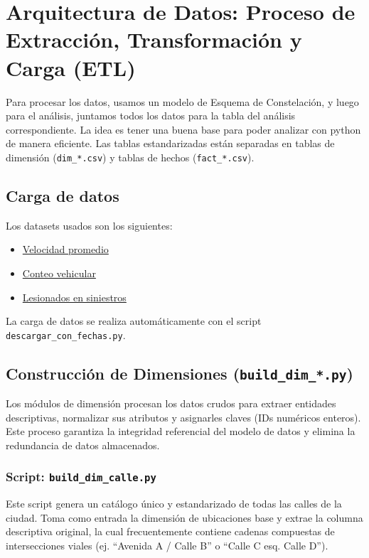 \section{Arquitectura de Datos: Proceso de Extracción, Transformación y Carga (ETL)}

Para procesar los datos, usamos un modelo de Esquema de Constelaci\'on,
y luego para el an\'alisis, juntamos todos los datos para la tabla del
an\'alisis correspondiente. 
La idea es tener una buena base para poder analizar con python 
de manera eficiente. Las tablas estandarizadas est\'an separadas en
tablas de dimensi\'on (\texttt{dim\_*.csv}) y tablas de hechos 
(\texttt{fact\_*.csv}).

\subsection{Carga de datos}

Los datasets usados son los siguientes:
\begin{itemize}[noitemsep]
    \item \href{https://catalogodatos.gub.uy/dataset/velocidad-promedio-vehicular-en-las-principales-avenidas-de-montevideo}{Velocidad promedio}
    \item \href{https://catalogodatos.gub.uy/dataset/conteo-vehicular-en-las-principales-avenidas-de-montevideo}{Conteo vehicular}
    \item \href{https://catalogodatos.gub.uy/dataset/base-anual-de-personas-lesionadas-en-siniestros-de-transito}{Lesionados en siniestros}
\end{itemize}

La carga de datos se realiza autom\'aticamente con el script \texttt{descargar\_con\_fechas.py}.

\subsection{Construcción de Dimensiones (\texttt{build\_dim\_*.py})}

Los módulos de dimensión procesan los datos crudos para extraer entidades
descriptivas, normalizar sus atributos y asignarles claves 
(IDs numéricos enteros). 
Este proceso garantiza la integridad referencial del modelo de datos y elimina
la redundancia de datos almacenados.

\subsubsection*{Script: \texttt{build\_dim\_calle.py}}
Este script genera un catálogo único y estandarizado de todas las calles de la
ciudad. 
Toma como entrada la dimensión de ubicaciones base y extrae la columna
descriptiva original, la cual frecuentemente contiene cadenas compuestas de 
intersecciones viales (ej. ``Avenida A / Calle B'' o ``Calle C esq. Calle D'').

